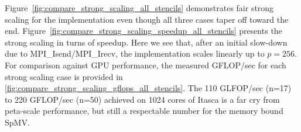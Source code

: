 \documentclass{report}
\begin{document}
Figure~\ref{fig:compare_strong_scaling_all_stencils} demonstrates fair strong scaling for the implementation even though all three cases taper off toward the end. Figure~\ref{fig:compare_strong_scaling_speedup_all_stencils} presents the strong scaling in turns of speedup. Here we see that, after an initial slow-down due to MPI\_Isend/MPI\_Irecv, the implementation scales linearly up to $p=256$. For comparison against GPU performance, the measured GFLOP/sec for each strong scaling case is provided in \ref{fig:compare_strong_scaling_gflops_all_stencils}. The 110 GLFOP/sec (n=17) to 220 GFLOP/sec (n=50) achieved on 1024 cores of Itasca is a far cry from peta-scale performance, but still a respectable number for the memory bound SpMV. 



%
\end{document}
